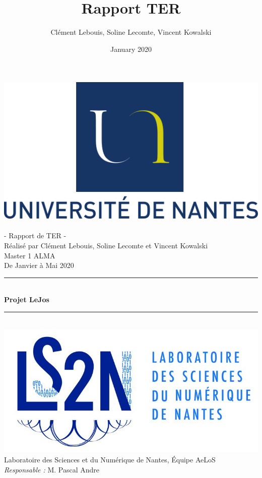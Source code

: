\documentclass[french, 12pt, a4paper]{article}
\title{Rapport TER}
\author{Clément Lebouis, Soline Lecomte, Vincent Kowalski}
\date{January 2020}
\newcommand{\HRule}{\rule{\linewidth}{0.5mm}}
\begin{document}

\begin{titlepage}
  \begin{center}

    \includegraphics[scale=0.5]{Images/UnivNantes.png}~\\[2.5cm]
    \textsf{\huge - Rapport de TER - }\\[0.5cm]
    \textsf{\Large Réalisé par Clément Lebouis, Soline Lecomte et Vincent Kowalski}\\[0.3cm]
    \textsf{\large Master 1 ALMA}\\[0.5cm]
    \textsf{\Large De Janvier à Mai 2020}\\[2cm]
        

    \HRule \\[0.4cm]
    { \huge \bfseries Projet LeJos\\[0.4cm] }

    \HRule \\[1.5cm]
    \includegraphics[scale=0.5]{Images/logoLS2N.jpg}
    \\[0.5cm]
    \textsf{\large Laboratoire des Sciences et du Numérique de Nantes, Équipe AeLoS}\\[0.2cm]
    \large\emph{Responsable : } M. Pascal Andre 
	\\[1.5cm]

  \end{center}
\end{titlepage}
\end{document}
